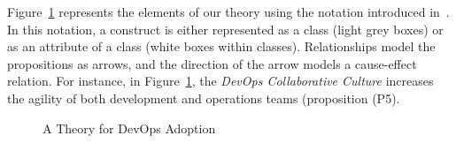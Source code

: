 Figure~\ref{fig:theory} represents the elements of our theory using the
notation introduced in~\cite{sjoberg2008}. In this notation,
a construct is either represented as a class (light grey
boxes) or as an attribute of a class (white boxes within classes).
Relationships model the propositions as arrows, and the direction
of the arrow models a cause-effect relation. For instance,
in Figure~\ref{fig:theory}, the \emph{DevOps Collaborative Culture}
increases the agility of both development and operations teams
(proposition (P5).


\begin{figure}[htb]
  \caption{A Theory for DevOps Adoption}
  \label{fig:theory} 
\end{figure}




